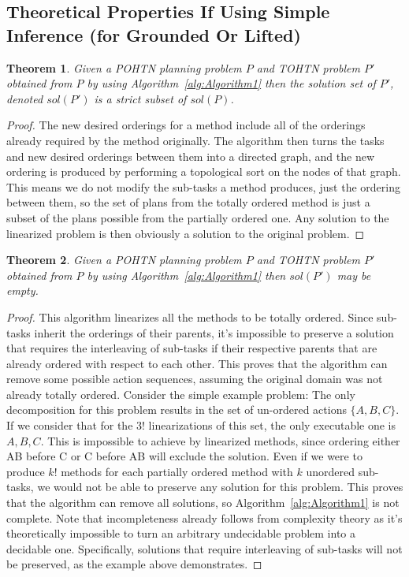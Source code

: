 \documentclass[letterpaper]{article} %
\newtheorem{theorem}{Theorem}
\begin{document}
\subsection{Theoretical Properties If Using Simple Inference (for Grounded Or Lifted)}
\begin{theorem}\label{thm:Soundness}
	Given a POHTN planning problem $P$ and TOHTN problem
	$P'$ obtained from $P$ by using Algorithm~\ref{alg:Algorithm1}
	then the solution set of $P'$, denoted $sol(P')$ is a strict subset of $sol(P)$.
\end{theorem}
\begin{proof}
	The new desired orderings for a method include all of the orderings already required by the method originally. The algorithm then turns the tasks and new desired orderings between them into a directed graph, and the new ordering is produced by performing a topological sort on the nodes of that graph. This means we do not modify the sub-tasks a method produces, just the ordering between them, so the set of plans from the totally ordered method is just a subset of the plans possible from the partially ordered one. Any solution to the linearized problem is then obviously a solution to the original problem.
\end{proof}



\begin{theorem}\label{thm:notCompleteness}
	Given a POHTN planning problem $P$ and TOHTN problem
	$P'$ obtained from $P$ by using Algorithm~\ref{alg:Algorithm1}
	then $sol(P')$ may be empty.
\end{theorem}
\begin{proof}
	This algorithm linearizes all the methods to be totally ordered. Since sub-tasks inherit the orderings of their parents, it's impossible to preserve a solution that requires the interleaving of sub-tasks if their respective parents that are already ordered with respect to each other. This proves that the algorithm can remove some possible action sequences, assuming the original domain was not already totally ordered. Consider the simple example problem:
	The only decomposition for this problem results in the set of un-ordered actions $\{A, B, C\}$.
	If we consider that for the $3!$ linearizations of this set, the only executable one is $A, B, C$. This is impossible to achieve by linearized methods, since ordering either AB before C or C before AB will exclude the solution. 
	Even if we were to produce $k!$ methods for each partially ordered method with $k$ unordered sub-tasks, we would not be able to preserve any solution for this problem.
	This proves that the algorithm can remove all solutions, so Algorithm~\ref{alg:Algorithm1} is not complete. Note that incompleteness already follows from complexity theory as it's theoretically impossible to turn an arbitrary undecidable problem into a decidable one.
	Specifically, solutions that require interleaving of sub-tasks will not be preserved, as the example above demonstrates.
\end{proof}
\end{document}
